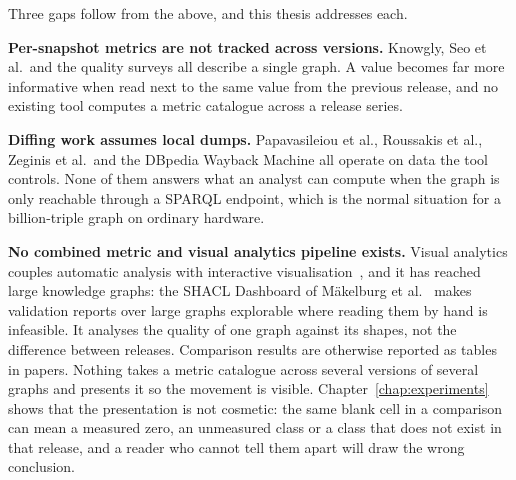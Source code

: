 Three gaps follow from the above, and this thesis addresses each.

\textbf{Per-snapshot metrics are not tracked across versions.} Knowgly, Seo et
al.\ and the quality surveys all describe a single graph. A value becomes far
more informative when read next to the same value from the previous release, and
no existing tool computes a metric catalogue across a release series.

\textbf{Diffing work assumes local dumps.} Papavasileiou et al., Roussakis et
al., Zeginis et al.\ and the DBpedia Wayback Machine all operate on data the tool
controls. None
of them answers what an analyst can compute when the graph is only reachable
through a SPARQL endpoint, which is the normal situation for a billion-triple
graph on ordinary hardware.

\textbf{No combined metric and visual analytics pipeline exists.} Visual
analytics couples automatic analysis with interactive
visualisation~\cite{keim2008visual}, and it has reached large knowledge graphs:
the SHACL Dashboard of Mäkelburg et al.~\cite{makelburg2025shacl} makes
validation reports over large graphs explorable where reading them by hand is
infeasible. It analyses the quality of one graph against its shapes, not the
difference between releases. Comparison results are otherwise reported as
tables in papers. Nothing takes a metric catalogue across
several versions of several graphs and presents it so the movement is visible.
Chapter~\ref{chap:experiments} shows that the presentation is not cosmetic: the
same blank cell in a comparison can mean a measured zero, an unmeasured class or
a class that does not exist in that release, and a reader who cannot tell them
apart will draw the wrong conclusion.
